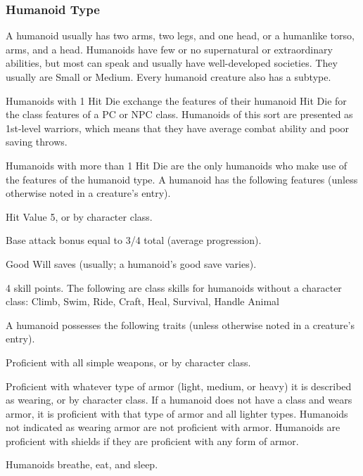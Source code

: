 {\subsubsection{Humanoid Type} A humanoid usually has two arms, two legs, and one head, or a humanlike torso, arms, and a head. Humanoids have few or no supernatural or extraordinary abilities, but most can speak and usually have well-developed societies. They usually are Small or Medium. Every humanoid creature also has a subtype.
\par Humanoids with 1 Hit Die exchange the features of their humanoid Hit Die for the class features of a PC or NPC class. Humanoids of this sort are presented as 1st-level warriors, which means that they have average combat ability and poor saving throws.
\par Humanoids with more than 1 Hit Die are the only humanoids who make use of the features of the humanoid type.
 A humanoid has the following features (unless otherwise noted in a creature's entry).
\begin{itemize*}
\item Hit Value 5, or by character class.
\item Base attack bonus equal to 3/4 total  (average progression).
\item Good Will saves (usually; a humanoid's good save varies).
\item 4 skill points. The following are class skills for humanoids without a character class: Climb, Swim, Ride, Craft, Heal, Survival, Handle Animal
\end{itemize*}
 A humanoid possesses the following traits (unless otherwise noted in a creature's entry).
\begin{itemize*}
\item Proficient with all simple weapons, or by character class.
\item Proficient with whatever type of armor (light, medium, or heavy) it is described as wearing, or by character class. If a humanoid does not have a class and wears armor, it is proficient with that type of armor and all lighter types. Humanoids not indicated as wearing armor are not proficient with armor. Humanoids are proficient with shields if they are proficient with any form of armor.
\item Humanoids breathe, eat, and sleep.
\end{itemize*}

}
